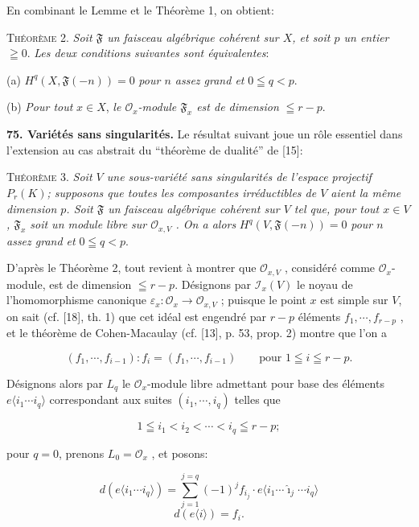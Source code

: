 En combinant le Lemme et le Théorème 1, on obtient:

\textsc{Théorème} 2. \textit{Soit $\mathfrak{F}$ un faisceau algébrique cohérent sur $X$, et soit $p$ un entier} $\geqq 0$. \textit{Les deux conditions suivantes sont équivalentes}:

(a) $H^q(X, \mathfrak{F}(-n)) = 0$ \textit{pour $n$ assez grand et} $0 \leqq q < p$.

(b) \textit{Pour tout} $x \in X$, \textit{le $\mathcal{O}_x$-module $\mathfrak{F}_x$ est de dimension} $\leqq r - p$.

\textbf{75. Variétés sans singularités.} Le résultat suivant joue un rôle essentiel dans l'extension au cas abstrait du ``théorème de dualité'' de [15]:

\textsc{Théorème} 3. \textit{Soit $V$ une sous-variété sans singularités de l'espace projectif $P_r(K)$; supposons que toutes les composantes irréductibles de $V$ aient la même dimension $p$. Soit $\mathfrak{F}$ un faisceau algébrique cohérent sur $V$ tel que, pour tout $x \in V$, $\mathfrak{F}_x$ soit un module libre sur $\mathcal{O}_{x,V}$ . On a alors} $H^q(V, \mathfrak{F}(-n)) = 0$ \textit{pour $n$ assez grand et} $0 \leqq q < p$.

D'après le Théorème 2, tout revient à montrer que $\mathcal{O}_{x,V}$ , considéré comme $\mathcal{O}_x$-module, est de dimension $\leqq r - p$. Désignons par $\mathcal{I}_x(V)$ le noyau de l'homomorphisme canonique $\varepsilon_x: \mathcal{O}_x \rightarrow \mathcal{O}_{x,V}$ ; puisque le point $x$ est simple sur $V$, on sait (cf. [18], th. 1) que cet idéal est engendré par $r - p$ éléments $f_1 , \cdots , f_{r-p}$ , et le théorème de Cohen-Macaulay (cf. [13], p. 53, prop. 2) montre que l'on a

\begin{equation*}
(f_1 , \cdots , f_{i-1}) : f_i = (f_1 , \cdots , f_{i-1}) \qquad \text{pour } 1 \leqq i \leqq r - p.
\end{equation*}

Désignons alors par $L_q$ le $\mathcal{O}_x$-module libre admettant pour base des éléments $e\langle i_1 \cdots i_q \rangle$ correspondant aux suites $(i_1 , \cdots , i_q)$ telles que

\begin{equation*}
1 \leqq i_1 < i_2 < \cdots < i_q \leqq r - p;
\end{equation*}

pour $q = 0$, prenons $L_0 = \mathcal{O}_x$ , et posons:

\begin{equation*}
d(e\langle i_1 \cdots i_q \rangle) = \sum_{j=1}^{j=q} (-1)^j f_{i_j} \cdot e\langle i_1 \cdots \hat{\imath}_j \cdots i_q \rangle
\end{equation*}
\begin{equation*}
d(e\langle i \rangle) = f_i .
\end{equation*}
